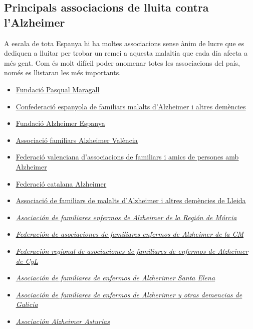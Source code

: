 \documentclass[a4paper,12pt]{article}
\begin{document}
\subsection*{Principals associacions de lluita contra l'Alzheimer}
A escala de tota Espanya hi ha moltes associacions sense ànim de lucre que es dediquen a lluitar per trobar un remei a aquesta malaltia que cada dia afecta a més gent. Com és molt difícil poder anomenar totes les associacions del país, només es llistaran les més importants.
\begin{itemize}
    \item \href{https://fpmaragall.org/ca/}{\underline{Fundació Pasqual Maragall}}
    \item \href{https://www.ceafa.es/es}{\underline{Confederació espanyola de familiars malalts d'Alzheimer i altres demències}}
    \item \href{http://www.alzfae.org/}{\underline{Fundació Alzheimer Espanya}}
    \item \href{https://www.afav.org/}{\underline{Associació familiars Alzheimer València}}
    \item \href{https://www.fevafa.org/quienes-somos/}{\underline{Federació valenciana d'associacions de familiars i amics de persones amb Alzheimer}}
    \item \href{https://www.fafac.cat/}{\underline{Federació catalana Alzheimer}}
    \item \href{http://www.lleidaparticipa.cat/index_web.php?idwc=czoxNToiYWx6aGVpbWVybGxlaWRhIjs=}{\underline{Associació de familiars de malalts d'Alzheimer i altres demències de Lleida}}
    \item \href{https://afamur.es/que-es-afamur/}{\underline{\textit{Asociación de familiares enfermos de Alzheimer de la Región de Múrcia}}}
    \item \href{https://fafal.org/}{\underline{\textit{Federación de asociaciones de familiares enfermos de Alzheimer de la CM}}}
    \item \href{https://www.afacayle.es/}{\underline{\textit{Federación regional de asociaciones de familiares de enfermos de Alzheimer de CyL}}}
    \item \href{https://www.alzheimersevilla.com/}{\underline{\textit{Asociación de familiares de enfermos de Alzherimer Santa Elena}}}
    \item \href{https://afaga.com/es/asociacion/historia/}{\underline{\textit{Asociación de familiares de enfermos de Alzherimer y otras demencias de Galicia}}}
    \item \href{https://www.asociacionalzheimer.com/}{\underline{\textit{Asociación Alzheimer Asturias}}}
\end{itemize}
\end{document}
